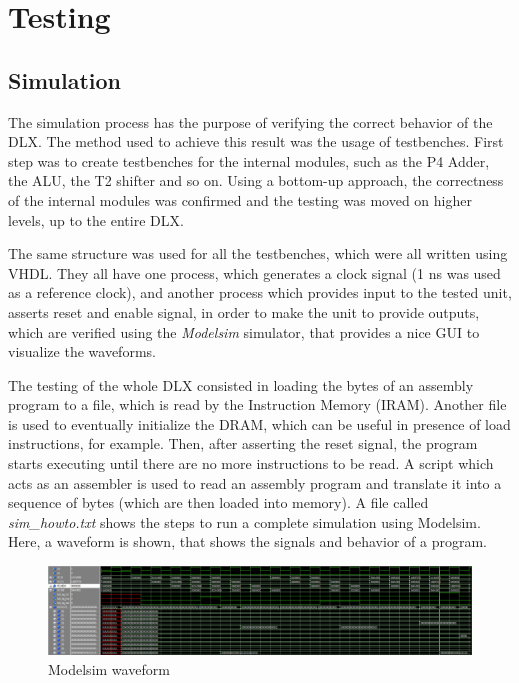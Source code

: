 \chapter{Testing}
\label{Simulation}

\section{Simulation}

The simulation process has the purpose of verifying the correct behavior of the DLX.
The method used to achieve this result was the usage of testbenches.
First step was to create testbenches for the internal modules, such as the P4 Adder, the ALU, the T2 shifter and so on.
Using a bottom-up approach, the correctness of the internal modules was confirmed and the testing was moved on higher levels, up to the entire DLX.

The same structure was used for all the testbenches, which were all written using VHDL.
They all have one process, which generates a clock signal (1 ns was used as a reference clock), and another process which
provides input to the tested unit, asserts reset and enable signal, in order to make the unit to provide outputs, which are verified using the \textit{Modelsim} simulator, that provides
a nice GUI to visualize the waveforms.

The testing of the whole DLX consisted in loading the bytes of an assembly program to a file, which is read by the Instruction Memory (IRAM).
Another file is used to eventually initialize the DRAM, which can be useful in presence of load instructions, for example.
Then, after asserting the reset signal, the program starts executing until there are no more instructions to be read.
A script which acts as an assembler is used to read an assembly program and translate it into a sequence of bytes (which are then loaded into memory).
A file called \textit{sim_howto.txt} shows the steps to run a complete simulation using Modelsim.
Here, a waveform is shown, that shows the signals and behavior of a program.

\begin{figure}[h!]
	\centering
	\includegraphics[width=\textwidth]{chapters/figures/waveform.png} 
	\caption{Modelsim waveform}
	\label{fig:wave}  %
	\end{figure}





